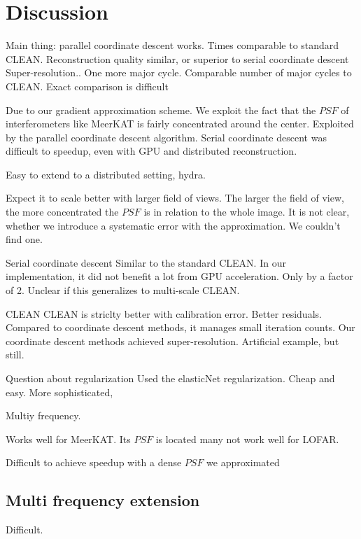 \section{Discussion}\label{discussion}
Main thing: parallel coordinate descent works.
Times comparable to standard CLEAN.
Reconstruction quality similar, or superior to serial coordinate descent
Super-resolution..
One more major cycle.
Comparable number of major cycles to CLEAN. Exact comparison is difficult

Due to our gradient approximation scheme. We exploit the fact that the $PSF$ of interferometers like MeerKAT is fairly concentrated around the center.
Exploited by the parallel coordinate descent algorithm. 
Serial coordinate descent was difficult to speedup, even with GPU and distributed reconstruction.

Easy to extend to a distributed setting, hydra.

Expect it to scale better with larger field of views. The larger the field of view, the more concentrated the $PSF$ is in relation to the whole image.
It is not clear, whether we introduce a systematic error with the approximation. We couldn't find one.

Serial coordinate descent
Similar to the standard CLEAN.
In our implementation, it did not benefit a lot from GPU acceleration. Only by a factor of 2. Unclear if this generalizes to multi-scale CLEAN.

CLEAN
CLEAN is striclty better with calibration error.
Better residuals. Compared to coordinate descent methods, it manages small iteration counts.
Our coordinate descent methods achieved super-resolution. Artificial example, but still.

Question about regularization
Used the elasticNet regularization. Cheap and easy. More sophisticated, 

Multiy frequency.






Works well for MeerKAT. Its $PSF$ is located many not work well for LOFAR.

Difficult to achieve speedup with a dense $PSF$ we approximated












\subsection{Multi frequency extension}\label{discussion:mfs}
Difficult.

